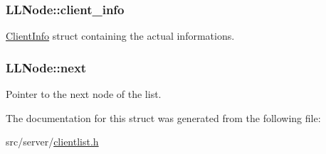 \subsubsection[{\texorpdfstring{client\+\_\+info}{client_info}}]{\setlength{\rightskip}{0pt plus 5cm}L\+L\+Node\+::client\+\_\+info}\hypertarget{structLLNode_ab4552dd6aa88846b769ed067679858c4}{}\label{structLLNode_ab4552dd6aa88846b769ed067679858c4}
{\ttfamily \hyperlink{structClientInfo}{Client\+Info}} struct containing the actual informations. 
\subsubsection[{\texorpdfstring{next}{next}}]{\setlength{\rightskip}{0pt plus 5cm}L\+L\+Node\+::next}\hypertarget{structLLNode_a55f6432e4bb952037758122d032aaaf2}{}\label{structLLNode_a55f6432e4bb952037758122d032aaaf2}
Pointer to the next node of the list. 

The documentation for this struct was generated from the following file\+:\begin{DoxyCompactItemize}
\item 
src/server/\hyperlink{clientlist_8h}{clientlist.\+h}\end{DoxyCompactItemize}
